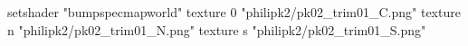 setshader "bumpspecmapworld"
    texture 0 "philipk2/pk02_trim01_C.png"
    texture n "philipk2/pk02_trim01_N.png"
    texture s "philipk2/pk02_trim01_S.png"
